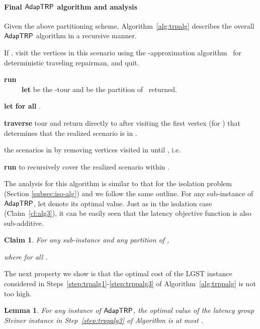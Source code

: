 \documentclass[11pt]{article}
\newtheorem{lemma}[thm]{Lemma}
\newtheorem{claim}[thm]{Claim}
\def\strp{\ensuremath{{\sf AdapTRP}}\xspace}
\def\lgs{{\sf LGST}\xspace}
\begin{document}
\paragraph{Final \strp algorithm and analysis}
Given the above partitioning scheme, Algorithm~\ref{alg:trpalg} describes the overall \strp algorithm in a recursive manner. 




\begin{algorithm}[!h]
  \caption{}
  \label{alg:trpalg}
  \begin{algorithmic}[1]
    \STATE If , visit the vertices in this scenario using the -approximation algorithm~\cite{fhr}
    for deterministic traveling repairman, and quit.

    \STATE \label{step:trp2} \textbf{run}  \\
    ~~~~~\textbf{let}  be the
    -tour and  be the partition of~ returned.

    \STATE \textbf{let}  \textbf{for all} .

    \STATE \label{step:trp3} \textbf{traverse} tour  and return
    directly to  after visiting the first vertex 
    (for ) that determines that the realized scenario is
    in .
    
     the scenarios in  by removing vertices visited in  until , i.e. 

    \STATE  \textbf{run}  to recursively cover the
    realized scenario within .
  \end{algorithmic}
\end{algorithm}


The analysis for this algorithm is similar to that for the isolation problem (Section \ref{subsec:iso-alg})
and we follow the same outline.  For any sub-instance  of \strp, let  denote its optimal value.
Just as in the isolation case (Claim~\ref{cl:alg3}), it can be easily seen that the latency objective function is also
sub-additive.
\begin{claim}\label{cl:trp-subadd}
  For any sub-instance  and any partition   of ,
  
  where  for all .
\end{claim}


The next property we show is that the optimal cost of the \lgs instance  considered in
Steps~\eqref{step:trpalg1}-\eqref{step:trppalg3} of Algorithm~\ref{alg:trppalg} is not too high.


\begin{lemma} \label{lem:latbound}
  For any instance  of \strp, the
  optimal value of the latency group Steiner instance   in
  Step~\ref{step:trppalg3} of Algorithm  is at most
  .
\end{lemma}
\end{document}
